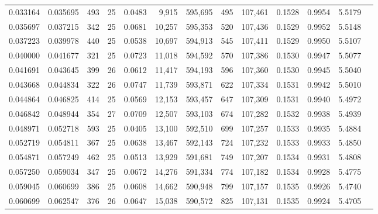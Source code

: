 \begin{tabular}{rrrrrrrrrrrrr}
0.033164 & 0.035695 &   493 &  25 &                                     0.0483 &   9,915 & 595,695 &     495 & 107,461 & 0.1528 & 0.9954 & 5.5179 \\
0.035697 & 0.037215 &   342 &  25 &                                     0.0681 &  10,257 & 595,353 &     520 & 107,436 & 0.1529 & 0.9952 & 5.5148 \\
0.037223 & 0.039978 &   440 &  25 &                                     0.0538 &  10,697 & 594,913 &     545 & 107,411 & 0.1529 & 0.9950 & 5.5107 \\
0.040000 & 0.041677 &   321 &  25 &                                     0.0723 &  11,018 & 594,592 &     570 & 107,386 & 0.1530 & 0.9947 & 5.5077 \\
0.041691 & 0.043645 &   399 &  26 &                                     0.0612 &  11,417 & 594,193 &     596 & 107,360 & 0.1530 & 0.9945 & 5.5040 \\
0.043668 & 0.044834 &   322 &  26 &                                     0.0747 &  11,739 & 593,871 &     622 & 107,334 & 0.1531 & 0.9942 & 5.5010 \\
0.044864 & 0.046825 &   414 &  25 &                                     0.0569 &  12,153 & 593,457 &     647 & 107,309 & 0.1531 & 0.9940 & 5.4972 \\
0.046842 & 0.048944 &   354 &  27 &                                     0.0709 &  12,507 & 593,103 &     674 & 107,282 & 0.1532 & 0.9938 & 5.4939 \\
0.048971 & 0.052718 &   593 &  25 &                                     0.0405 &  13,100 & 592,510 &     699 & 107,257 & 0.1533 & 0.9935 & 5.4884 \\
0.052719 & 0.054811 &   367 &  25 &                                     0.0638 &  13,467 & 592,143 &     724 & 107,232 & 0.1533 & 0.9933 & 5.4850 \\
0.054871 & 0.057249 &   462 &  25 &                                     0.0513 &  13,929 & 591,681 &     749 & 107,207 & 0.1534 & 0.9931 & 5.4808 \\
0.057250 & 0.059034 &   347 &  25 &                                     0.0672 &  14,276 & 591,334 &     774 & 107,182 & 0.1534 & 0.9928 & 5.4775 \\
0.059045 & 0.060699 &   386 &  25 &                                     0.0608 &  14,662 & 590,948 &     799 & 107,157 & 0.1535 & 0.9926 & 5.4740 \\
0.060699 & 0.062547 &   376 &  26 &                                     0.0647 &  15,038 & 590,572 &     825 & 107,131 & 0.1535 & 0.9924 & 5.4705 \\

\end{tabular}
